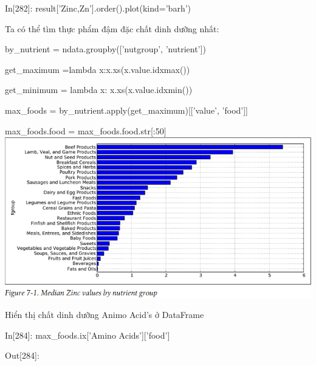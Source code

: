 \par\quad\textup{In[282]: result['Zinc,Zn'].order().plot(kind='barh')}
\par\textup{Ta có thể tìm thực phẩm đậm đặc chất dinh dưỡng nhất:}
\par\quad\textup{by\_nutrient = ndata.groupby(['nutgroup', 'nutrient'])}
\par\quad\textup{get\_maximum =lambda x:x.xs(x.value.idxmax())}
\par\quad\textup{get\_minimum = lambda x: x.xs(x.value.idxmin())}
\par\quad\textup{max\_foods = by\_nutrient.apply(get\_maximum)[['value', 'food']]}
\par\quad\textup{max\_foods.food = max\_foods.food.str[:50]}\\
\includegraphics[scale=1.3]{Images/figure.png}
\par\textup{Hiển thị chất dinh dưỡng Animo Acid's ở DataFrame}
\par\quad\textup{In[284]: max\_foods.ix['Amino Acids']['food']}
\par\quad\textup{Out[284]:}
